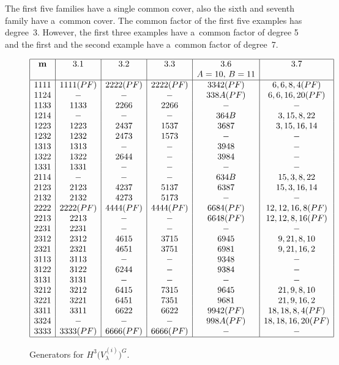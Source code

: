 \documentclass[pdftex]{sigma}
\numberwithin{equation}{section}
\begin{document}
The f\/irst f\/ive families have a single common cover, also the sixth and seventh family have a~common cover. The common factor of the f\/irst f\/ive examples has degree~3. However, the f\/irst three examples have a~common factor of degree 5 and the f\/irst and the second example have a~common factor of degree~7.

\begin{figure}[t]
\begin{gather*}
\begin{array}{|c|c|c|c|c|c|}
\hline
\mathbf{m} & 3.1& 3.2 & 3.3 & 3.6 & 3.7 \\
 &&&&A=10, \, B=11 &\\
\hline
1111& 1111(PF)&2222 (PF) &2222(PF) & 3342 (PF) &6,6,8,4 (PF)\\
1124 & -&-& - &338A (PF) &6,6,16,20 (PF) \\
1133& 1133&2266 & 2266 &- &-\\
1214 & -&- & -&364B & 3,15,8,22\\
1223& 1223&2437 & 1537 & 3687 &3,15,16,14\\
1232& 1232&2473 & 1573 & - & -\\
1313& 1313&- & - & 3948 & -\\
1322& 1322&2644 & - & 3984 & -\\
1331& 1331&- & - & - & -\\
2114 & -&- & - &634B &15,3,8,22\\
2123& 2123&4237 & 5137 & 6387 &15,3,16,14\\
2132& 2132&4273 & 5173 & - & -\\
2222 & 2222(PF)&4444 (PF) &4444(PF) & 6684 (PF) & 12,12,16,8 (PF)\\
2213& 2213&- & - & 6648 (PF) & 12,12,8,16 (PF)\\
2231& 2231&- & - & - & -\\
2312& 2312&4615 & 3715 & 6945 &9,21,8,10\\
2321& 2321&4651 & 3751 & 6981&9,21,16,2\\
3113& 3113&- & - & 9348& -\\
3122& 3122&6244 & - & 9384 & -\\
3131& 3131&- & - & - & -\\
3212& 3212&6415 & 7315 &9645 &21,9,8,10\\
3221& 3221& 6451 & 7351 & 9681 & 21,9,16,2\\
3311& 3311&6622 & 6622 & 9942(PF)& 18,18,8,4 (PF)\\
3324& -& - & -& 998A (PF) & 18,18,16,20 (PF)\\
3333& 3333(PF)& 6666 (PF) & 6666(PF) & - &-\\
\hline
\end{array}
\end{gather*}\vspace{-5mm}

\caption{Generators for $H^3\big(V^{(i)}_\lambda\big)^G$.} \label{tblform}
\end{figure}
\end{document}
